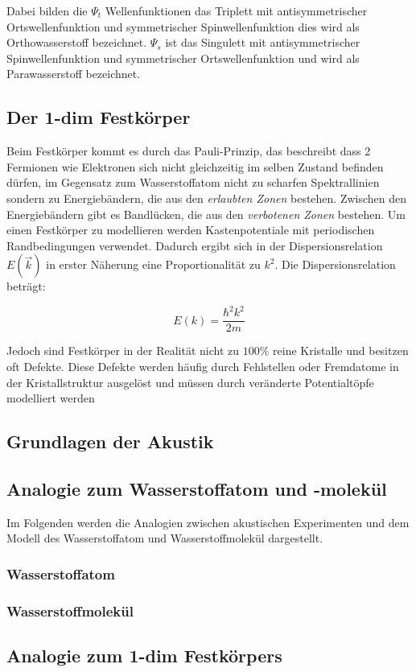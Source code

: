 Dabei bilden die $\Psi_t$ Wellenfunktionen das Triplett mit antisymmetrischer Ortswellenfunktion und symmetrischer Spinwellenfunktion dies wird als Orthowasserstoff bezeichnet. $\Psi_s$ ist das Singulett mit antisymmetrischer Spinwellenfunktion und symmetrischer Ortswellenfunktion und wird als Parawasserstoff bezeichnet. 

\subsection{Der 1-dim Festkörper}
\label{sec:festkoerper}

Beim Festkörper kommt es durch das Pauli-Prinzip, das beschreibt dass 2 Fermionen wie Elektronen sich nicht gleichzeitig im selben Zustand befinden dürfen, im Gegensatz zum Wasserstoffatom nicht zu scharfen Spektrallinien sondern zu Energiebändern, die aus den \textit{erlaubten Zonen} bestehen. Zwischen den Energiebändern gibt es Bandlücken, die aus den \textit{verbotenen Zonen} bestehen. Um einen Festkörper zu modellieren werden Kastenpotentiale mit periodischen Randbedingungen verwendet. Dadurch ergibt sich in der Dispersionsrelation $E(\vec{k})$ in erster Näherung eine Proportionalität zu $k^2$. Die Dispersionsrelation beträgt:

\begin{equation}
    E(k) = \frac{\hbar^2 k^2}{2 m}
    \label{eqn:disp}
\end{equation}

Jedoch sind Festkörper in der Realität nicht zu $100 \%$ reine Kristalle und besitzen oft Defekte. Diese Defekte werden häufig durch Fehlstellen oder Fremdatome in der Kristallstruktur ausgelöst und müssen durch veränderte Potentialtöpfe modelliert werden

\subsection{Grundlagen der Akustik}
\label{sec:akustik}



\subsection{Analogie zum Wasserstoffatom und -molekül}
\label{sec:analogien}

Im Folgenden werden die Analogien zwischen akustischen Experimenten und dem Modell des Wasserstoffatom und Wasserstoffmolekül dargestellt.

\subsubsection{Wasserstoffatom}
\label{sec:ana-H}



\subsubsection{Wasserstoffmolekül}
\label{sec:ana-H2}



\subsection{Analogie zum 1-dim Festkörpers}
\label{ana-fest}

